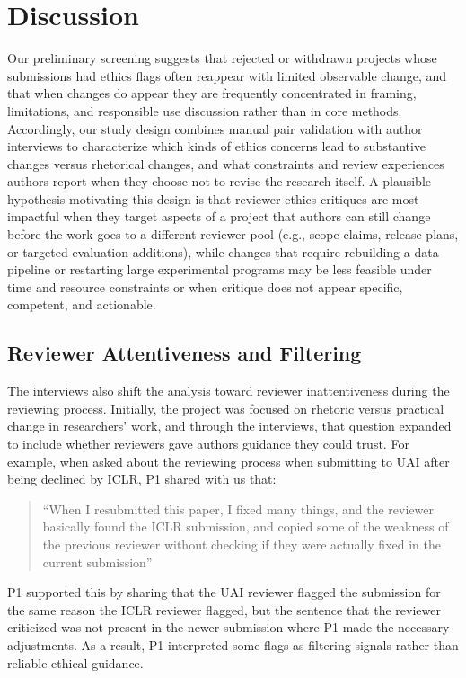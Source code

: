 \documentclass[sigconf,nonacm]{acmart} %
\begin{document}
\section{Discussion}

Our preliminary screening suggests that rejected or withdrawn projects whose submissions had ethics flags often reappear with limited observable change, and that when changes do appear they are frequently concentrated in framing, limitations, and responsible use discussion rather than in core methods. Accordingly, our study design combines manual pair validation with author interviews to characterize which kinds of ethics concerns lead to substantive changes versus rhetorical changes, and what constraints and review experiences authors report when they choose not to revise the research itself. A plausible hypothesis motivating this design is that reviewer ethics critiques are most impactful when they target aspects of a project that authors can still change before the work goes to a different reviewer pool (e.g., scope claims, release plans, or targeted evaluation additions), while changes that require rebuilding a data pipeline or restarting large experimental programs may be less feasible under time and resource constraints or when critique does not appear specific, competent, and actionable.

\subsection{Reviewer Attentiveness and Filtering}

The interviews also shift the analysis toward reviewer inattentiveness during the reviewing process. Initially, the project was focused on rhetoric versus practical change in researchers' work, and through the interviews, that question expanded to include whether reviewers gave authors guidance they could trust. For example, when asked about the reviewing process when submitting to UAI after being declined by ICLR, P1 shared with us that:

\begin{quote}
    \small
    ``When I resubmitted this paper, I fixed many things, and the reviewer basically found the ICLR submission, and copied some of the weakness of the previous reviewer without checking if they were actually fixed in the current submission''

\end{quote}
P1 supported this by sharing that the UAI reviewer flagged the submission for the same reason the ICLR reviewer flagged, but the sentence that the reviewer criticized was not present in the newer submission where P1 made the necessary adjustments. As a result, P1 interpreted some flags as filtering signals rather than reliable ethical guidance.
\end{document}
